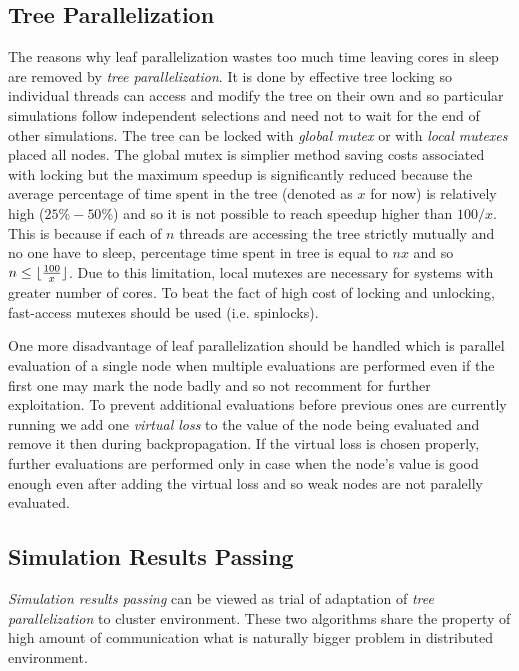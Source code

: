 \subsection{Tree Parallelization}

The reasons why leaf parallelization wastes too much time leaving cores in sleep are removed by
\emph{tree parallelization}. It is done by effective tree locking so individual threads can access
and modify the tree on their own and so particular simulations follow independent selections and
need not to wait for the end of other simulations. The tree can be locked with \emph{global mutex}
or with \emph{local mutexes} placed all nodes. The global mutex is simplier method saving costs
associated with locking but the maximum speedup is significantly reduced because the average
percentage of time spent in the tree (denoted as $x$ for now) is relatively high ($25\%-50\%$) and
so it is not possible to reach speedup higher than $100/x$. This is because if each of $n$ threads are
accessing the tree  strictly mutually and no one have to sleep, percentage time spent in tree is
equal to $n x$ and so $n \le \lfloor {100 \over{x}} \rfloor$. Due to this limitation, local mutexes
are necessary for systems with greater number of cores. To beat the fact of high cost of locking and
unlocking, fast-access mutexes should be used (i.e. spinlocks).

One more disadvantage of leaf parallelization should be handled which is parallel evaluation of a
single node when multiple evaluations are performed even if the first one may mark the node badly
and so not recomment for further exploitation. To prevent additional evaluations before previous
ones are currently running we add one \emph{virtual loss} to the value of the node being evaluated
and remove it then during backpropagation.
If the virtual loss is chosen properly, further evaluations are performed only in case when the
node's value is good enough even after adding the virtual loss and so weak nodes are not paralelly
evaluated.

\subsection{Simulation Results Passing}

\emph{Simulation results passing} can be viewed as trial of adaptation of \emph{tree
parallelization} to cluster environment. These two algorithms share the property of high amount of
communication what is naturally bigger problem in distributed environment.

